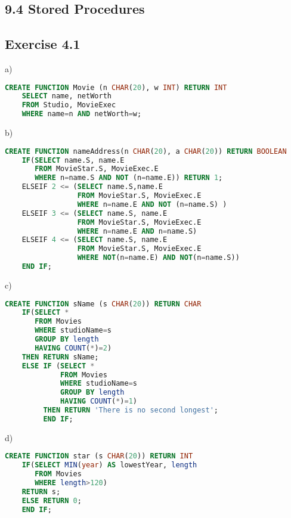 \documentclass[../../main.tex]{subfiles}
\begin{document}
\subsection{9.4 Stored Procedures}

\subsection*{Exercise 4.1}

a)

\begin{lstlisting}[language=sql]
  CREATE FUNCTION Movie (n CHAR(20), w INT) RETURN INT
    SELECT name, netWorth
    FROM Studio, MovieExec
    WHERE name=n AND netWorth=w;
\end{lstlisting}

b)

\begin{lstlisting}[language=sql]
  CREATE FUNCTION nameAddress(n CHAR(20), a CHAR(20)) RETURN BOOLEAN
    IF(SELECT name.S, name.E
       FROM MovieStar.S, MovieExec.E
       WHERE n=name.S AND NOT (n=name.E)) RETURN 1;
    ELSEIF 2 <= (SELECT name.S,name.E
                 FROM MovieStar.S, MovieExec.E
                 WHERE n=name.E AND NOT (n=name.S) )
    ELSEIF 3 <= (SELECT name.S, name.E
                 FROM MovieStar.S, MovieExec.E
                 WHERE n=name.E AND n=name.S)
    ELSEIF 4 <= (SELECT name.S, name.E
                 FROM MovieStar.S, MovieExec.E
                 WHERE NOT(n=name.E) AND NOT(n=name.S))
    END IF;
\end{lstlisting}

c)

\begin{lstlisting}[language=sql]
  CREATE FUNCTION sName (s CHAR(20)) RETURN CHAR
    IF(SELECT *
       FROM Movies
       WHERE studioName=s
       GROUP BY length
       HAVING COUNT(*)=2)
    THEN RETURN sName;
    ELSE IF (SELECT *
             FROM Movies
             WHERE studioName=s
             GROUP BY length
             HAVING COUNT(*)=1)
         THEN RETURN 'There is no second longest';
         END IF;
\end{lstlisting}

d)

\begin{lstlisting}[language=sql]
  CREATE FUNCTION star (s CHAR(20)) RETURN INT
    IF(SELECT MIN(year) AS lowestYear, length
       FROM Movies
       WHERE length>120)
    RETURN s;
    ELSE RETURN 0;
    END IF;
\end{lstlisting}
\end{document}
